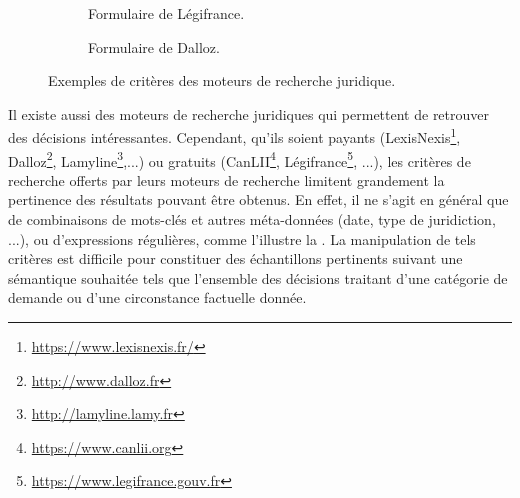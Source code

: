 \begin{figure}[!htb]
	\centering
	\begin{subfigure}[t]{\textwidth}
		\centering
		\caption{Formulaire de Légifrance.}
	\end{subfigure}%

	\begin{subfigure}[t]{0.75\textwidth}
		\centering
		\caption{Formulaire de Dalloz.}
	\end{subfigure}
	\caption{Exemples de critères des moteurs de recherche juridique.}\label{fig:intro:juriSearchForm}
\end{figure}

Il existe aussi des moteurs de recherche juridiques qui permettent de retrouver des décisions intéressantes. Cependant, qu'ils soient payants (LexisNexis\footnote{\url{https://www.lexisnexis.fr/}}, Dalloz\footnote{\url{http://www.dalloz.fr}}, Lamyline\footnote{\url{http://lamyline.lamy.fr}},...) ou gratuits (CanLII\footnote{\url{https://www.canlii.org}}, Légifrance\footnote{\url{https://www.legifrance.gouv.fr}}, ...), les critères de recherche offerts par leurs moteurs de recherche limitent grandement la pertinence des résultats pouvant être obtenus. En effet, il ne s'agit en général que de combinaisons de mots-clés et autres méta-données (date, type de juridiction, ...), ou d'expressions régulières, comme l'illustre la . La manipulation de tels critères est difficile pour constituer des échantillons pertinents suivant une sémantique souhaitée tels que l'ensemble des décisions traitant d'une catégorie de demande ou d'une circonstance factuelle donnée. 


